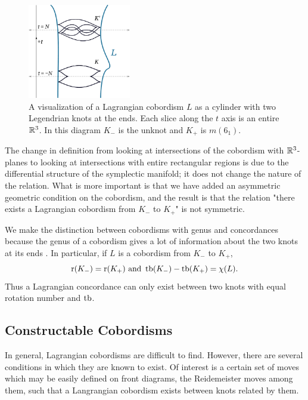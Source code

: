 \begin{figure}[ht]
    \centering
    \includegraphics[width=0.4\textwidth]{images/cobordism-visualization.pdf}
    \caption{A visualization of a Lagrangian cobordism $L$ as a cylinder with two Legendrian knots at the ends. Each slice along the $t$ axis is an entire $\mathbb{R}^3$. In this diagram $K_-$ is the unknot and $K_+$ is $m(6_1)$.}%
    \label{fig:cobordism-vis}
\end{figure}

The change in definition from looking at intersections of the cobordism with $\mathbb{R}^3$-planes to looking at intersections with entire rectangular regions is due to the differential structure of the symplectic manifold; it does not change the nature of the relation. What is more important is that we have added an asymmetric geometric condition on the cobordism, and the result is that the relation "there exists a Lagrangian cobordism from $K_-$ to $K_+$" is not symmetric.

We make the distinction between cobordisms with genus and concordances because the genus of a cobordism gives a lot of information about the two knots at its ends \cite{chantraine2010}. In particular, if $L$ is a cobordism from $K_-$ to $K_+$,
\[
    \operatorname{r}(K_-) = \operatorname{r}(K_+) \text{     and     } \operatorname{tb}(K_-) - \operatorname{tb}(K_+) = \chi(L).
\]
Thus a Lagrangian concordance can only exist between two knots with equal rotation number and $\operatorname{tb}$.


\subsection{Constructable Cobordisms}

In general, Lagrangian cobordisms are difficult to find. However, there are several conditions in which they are known to exist. Of interest is a certain set of moves which may be easily defined on front diagrams, the Reidemeister moves among them, such that a Langrangian cobordism exists between knots related by them.

